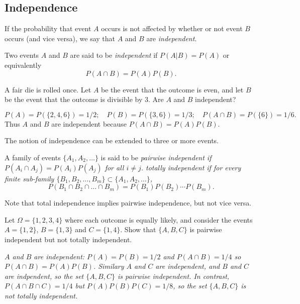 \subsection{Independence}

If the probability that event $A$ occurs is not affected by whether or not event $B$ occurs (and vice versa), we say that $A$ and $B$ are \emph{independent}. 

\begin{definition}
Two events $A$ and $B$ are said to be \emph{independent} if $P(A|B)=P(A)$ or equivalently
\[
P(A\cap B) = P(A)P(B).
\]
\end{definition}

\begin{example}
A fair die is rolled once. Let $A$ be the event that the outcome is even, and let $B$ be the event that the outcome is divisible by $3$. Are $A$ and $B$ independent?
\begin{solution}
\[
P(A) = P(\{2,4,6\}) = 1/2;\quad
P(B) = P(\{3,6\}) = 1/3;\quad
P(A\cap B) = P(\{6\}) = 1/6.
\]
Thus $A$ and $B$ are independent because $P(A\cap B) = P(A)P(B)$.
\end{solution}
\end{example}

The notion of independence can be extended to three or more events.
 
\begin{definition}
A family of events $\{A_1,A_2,\ldots\}$ is said to be 
\ben
\it \emph{pairwise independent} if $P(A_i\cap A_j)=P(A_i)P(A_j)$ for all $i\neq j$.
\it \emph{totally independent} if for every finite sub-family 
$\{B_1,B_2,\ldots,B_m\}\subset \{A_1,A_2,\ldots\}$, 
\[
P(B_1\cap B_2\cap \ldots \cap B_m) = P(B_1)P(B_2)\cdots P(B_m).
\]
\een
\end{definition}
Note that total independence implies pairwise independence, but not vice versa.

\begin{example}
Let $\Omega=\{1,2,3,4\}$ where each outcome is equally likely, and consider the events $A=\{1,2\}$, $B=\{1,3\}$ and $C=\{1,4\}$. Show that $\{A,B,C\}$ is pairwise independent but not totally independent.
\begin{solution}
\bit
\it
$A$ and $B$ are independent: $P(A)=P(B)=1/2$ and $P(A\cap B)=1/4$ so $P(A\cap B) = P(A)P(B)$. 
\it
Similary $A$ and $C$ are independent, and $B$ and $C$ are indpendent, so the set $\{A,B,C\}$ is pairwise independent. 
\it
In contrast, $P(A\cap B\cap C) = 1/4$ but $P(A)P(B)P(C)=1/8$, so the set $\{A,B,C\}$ is not totally independent.
\eit
\end{solution}
\end{example}

